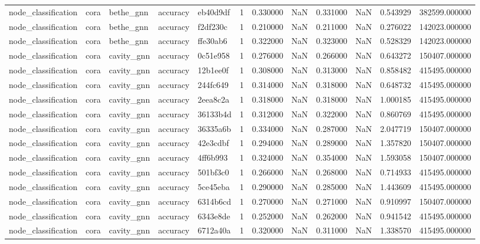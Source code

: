 \begin{tabular}{lllllrrrrrrr}
node_classification & cora & bethe_gnn & accuracy & eb40d9df & 1 & 0.330000 & NaN & 0.331000 & NaN & 0.543929 & 382599.000000 \\
node_classification & cora & bethe_gnn & accuracy & f2df230c & 1 & 0.210000 & NaN & 0.211000 & NaN & 0.276022 & 142023.000000 \\
node_classification & cora & bethe_gnn & accuracy & ffe30ab6 & 1 & 0.322000 & NaN & 0.323000 & NaN & 0.528329 & 142023.000000 \\
node_classification & cora & cavity_gnn & accuracy & 0c51e958 & 1 & 0.276000 & NaN & 0.266000 & NaN & 0.643272 & 150407.000000 \\
node_classification & cora & cavity_gnn & accuracy & 12b1ee0f & 1 & 0.308000 & NaN & 0.313000 & NaN & 0.858482 & 415495.000000 \\
node_classification & cora & cavity_gnn & accuracy & 244fc649 & 1 & 0.314000 & NaN & 0.318000 & NaN & 0.648732 & 415495.000000 \\
node_classification & cora & cavity_gnn & accuracy & 2eea8c2a & 1 & 0.318000 & NaN & 0.318000 & NaN & 1.000185 & 415495.000000 \\
node_classification & cora & cavity_gnn & accuracy & 36133b4d & 1 & 0.312000 & NaN & 0.322000 & NaN & 0.860769 & 415495.000000 \\
node_classification & cora & cavity_gnn & accuracy & 36335a6b & 1 & 0.334000 & NaN & 0.287000 & NaN & 2.047719 & 150407.000000 \\
node_classification & cora & cavity_gnn & accuracy & 42e3cdbf & 1 & 0.294000 & NaN & 0.289000 & NaN & 1.357820 & 150407.000000 \\
node_classification & cora & cavity_gnn & accuracy & 4ff6b993 & 1 & 0.324000 & NaN & 0.354000 & NaN & 1.593058 & 150407.000000 \\
node_classification & cora & cavity_gnn & accuracy & 501bf3c0 & 1 & 0.266000 & NaN & 0.268000 & NaN & 0.714933 & 415495.000000 \\
node_classification & cora & cavity_gnn & accuracy & 5ce45eba & 1 & 0.290000 & NaN & 0.285000 & NaN & 1.443609 & 415495.000000 \\
node_classification & cora & cavity_gnn & accuracy & 6314b6cd & 1 & 0.270000 & NaN & 0.271000 & NaN & 0.910997 & 150407.000000 \\
node_classification & cora & cavity_gnn & accuracy & 6343e8de & 1 & 0.252000 & NaN & 0.262000 & NaN & 0.941542 & 415495.000000 \\
node_classification & cora & cavity_gnn & accuracy & 6712a40a & 1 & 0.320000 & NaN & 0.311000 & NaN & 1.338570 & 415495.000000 \\

\end{tabular}
